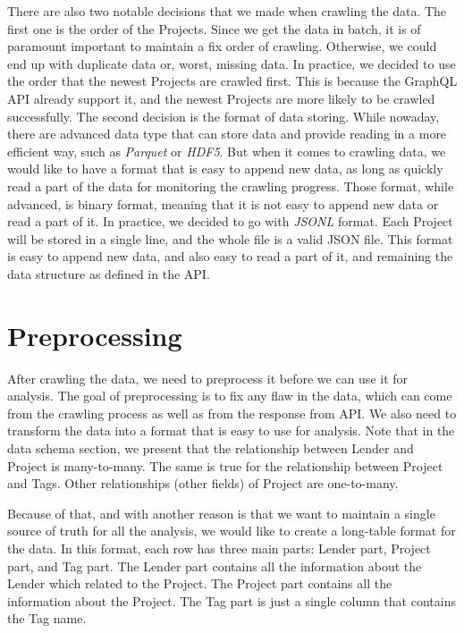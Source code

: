 There are also two notable decisions that we made when crawling the data.
The first one is the order of the Projects.
Since we get the data in batch, it is of paramount important to maintain a fix order of crawling.
Otherwise, we could end up with duplicate data or, worst, missing data.
In practice, we decided to use the order that the newest Projects are crawled first.
This is because the GraphQL API already support it, and the newest Projects are more likely to be crawled successfully.
The second decision is the format of data storing.
While nowaday, there are advanced data type that can store data and provide reading in a more efficient way,
such as \textit{Parquet}\cite{parquet} or \textit{HDF5}\cite{hdf5}.
But when it comes to crawling data, we would like to have a format that is easy to append new data,
as long as quickly read a part of the data for monitoring the crawling progress.
Those format, while advanced, is binary format, meaning that it is not easy to append new data or read a part of it.
In practice, we decided to go with \textit{JSONL} format.
Each Project will be stored in a single line, and the whole file is a valid JSON file.
This format is easy to append new data, and also easy to read a part of it, and remaining the data structure as defined in the API.

\section{Preprocessing}

After crawling the data, we need to preprocess it before we can use it for analysis.
The goal of preprocessing is to fix any flaw in the data, which can come from the crawling process as well as from the response from API.
We also need to transform the data into a format that is easy to use for analysis.
Note that in the data schema section, we present that the relationship between Lender and Project is many-to-many.
The same is true for the relationship between Project and Tags.
Other relationships (other fields) of Project are one-to-many.

Because of that, and with another reason is that we want to maintain a single source of truth for all the analysis,
we would like to create a long-table format for the data.
In this format, each row has three main parts: Lender part, Project part, and Tag part.
The Lender part contains all the information about the Lender which related to the Project.
The Project part contains all the information about the Project.
The Tag part is just a single column that contains the Tag name.




